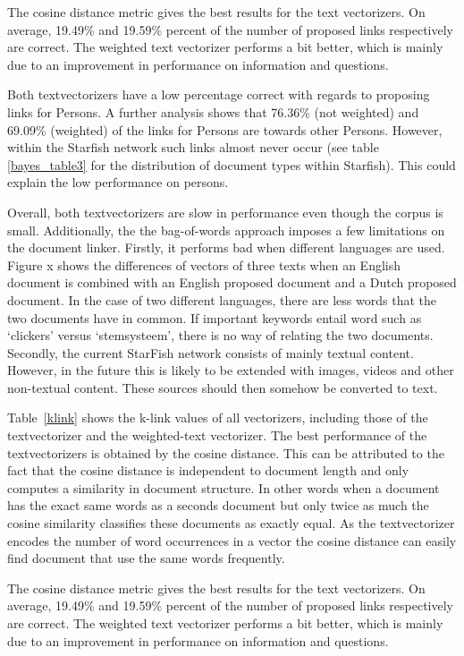 The cosine distance metric gives the best results for the text vectorizers. On average, 19.49\% and 19.59\% percent of the number of proposed links respectively are correct. The weighted text vectorizer performs a bit better, which is mainly due to an improvement in performance on information and questions.

Both textvectorizers have a low percentage correct with regards to proposing links for Persons. A further analysis shows that 76.36\% (not weighted) and 69.09\% (weighted) of the links for Persons are towards other Persons. However, within the Starfish network such links almost never occur (see table \ref{bayes_table3} for the distribution of document types within Starfish). This could explain the low performance on persons. 

Overall, both textvectorizers are slow in performance even though the corpus is small. Additionally, the the bag-of-words approach imposes a few limitations on the document linker. Firstly, it performs bad when different languages are used. Figure x shows the differences of vectors of three texts when an English document is combined with an English proposed document and a Dutch proposed document. In the case of two different languages, there are less words that the two documents have in common. If important keywords entail word such as `clickers' versus `stemsysteem', there is no way of relating the two documents. Secondly, the current StarFish network consists of mainly textual content. However, in the future this is likely to be extended with images, videos and other non-textual content. These sources should then somehow be converted to text.

Table~\ref{klink} shows the k-link values of all vectorizers, including those
of the textvectorizer and the weighted-text vectorizer. The best performance of
the textvectorizers is obtained by the cosine distance. This can be
attributed to the fact that the cosine distance is independent to document
length and only computes a similarity in document structure. In other words
when a document has the exact same words as a seconds document but only twice
as much the cosine similarity classifies these documents as exactly equal. As
the textvectorizer encodes the number of word occurrences in a vector the
cosine distance can  easily find document that use the same words frequently.

The cosine distance metric gives the best results for the text vectorizers. On
average, 19.49\% and 19.59\% percent of the number of proposed links
respectively are correct. The weighted text vectorizer performs a bit better,
which is mainly due to an improvement in performance on information and
questions. %

